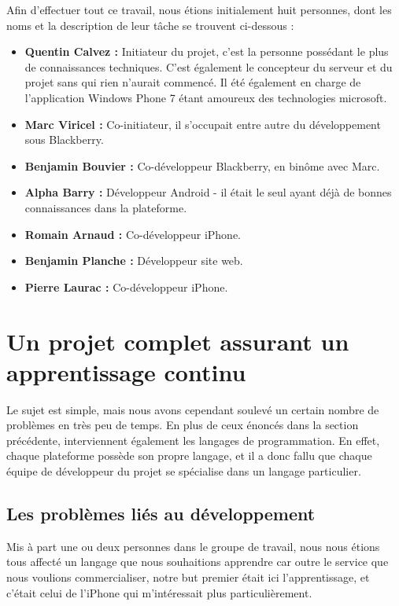 \documentclass{article}
\begin{document}
Afin d'effectuer tout ce travail, nous étions initialement huit personnes, dont les noms et la description de leur tâche se trouvent ci-dessous :
	\begin{itemize}
		\item \textbf{Quentin Calvez :} Initiateur du projet, c'est la personne possédant le plus de connaissances techniques. C'est également le concepteur du serveur et du projet sans qui rien n'aurait commencé. Il été également en charge de l'application Windows Phone 7 étant amoureux des technologies microsoft.
		\item \textbf{Marc Viricel :} Co-initiateur, il s'occupait entre autre du développement sous Blackberry.
		\item \textbf{Benjamin Bouvier :} Co-développeur Blackberry, en binôme avec Marc.
		\item \textbf{Alpha Barry :} Développeur Android - il était le seul ayant déjà de bonnes connaissances dans la plateforme.
		\item \textbf{Romain Arnaud :} Co-développeur iPhone.
		\item \textbf{Benjamin Planche :} Développeur site web.
		\item \textbf{Pierre Laurac :} Co-développeur iPhone.
	\end{itemize}

\section{Un projet complet assurant un apprentissage continu}

Le sujet est simple, mais nous avons cependant soulevé un certain nombre de problèmes en très peu de temps. En plus de ceux énoncés dans la section précédente, interviennent également les langages de programmation. En effet, chaque plateforme possède son propre langage, et il a donc fallu que chaque équipe de développeur du projet se spécialise dans un langage particulier. \\

\subsection{Les problèmes liés au développement}
Mis à part une ou deux personnes dans le groupe de travail, nous nous étions tous affecté un langage que nous souhaitions apprendre car outre le service que nous voulions commercialiser, notre but premier était ici l'apprentissage, et c'était celui de l'iPhone qui m'intéressait plus particulièrement. \\
\end{document}
